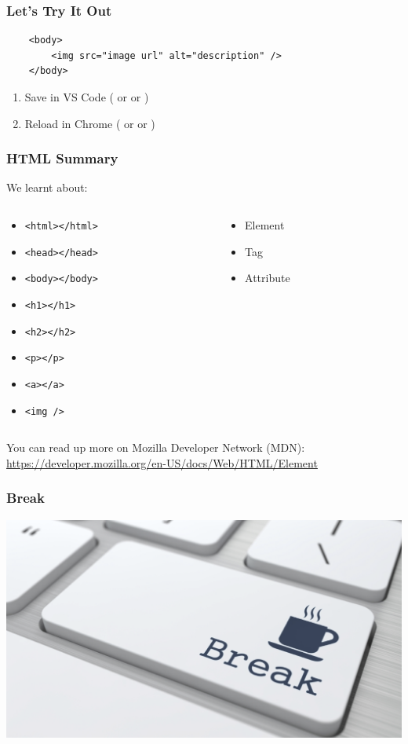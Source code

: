 \documentclass[12pt]{beamer}
\begin{document}
\begin{frame}[fragile]
\frametitle{Let's Try It Out}
\begin{verbatim}
	<body>
		<img src="image url" alt="description" />
	</body>
\end{verbatim}
\begin{enumerate}
	\item Save in VS Code ( or  or )
	\item Reload in Chrome ( or  or )
\end{enumerate}
\end{frame}

\begin{frame}
\frametitle{HTML Summary}
We learnt about:
\begin{columns}
	\begin{column}{0.5\textwidth}
		\begin{itemize}
			\item \texttt{<html></html>}
			\item \texttt{<head></head>}
			\item \texttt{<body></body>}
			\item \texttt{<h1></h1>}
			\item \texttt{<h2></h2>}
			\item \texttt{<p></p>}
			\item \texttt{<a></a>}
			\item \texttt{<img />}
		\end{itemize}
	\end{column}
	\begin{column}{0.5\textwidth}
		\begin{itemize}
			\item Element
			\item Tag
			\item Attribute
		\end{itemize}
	\end{column}
\end{columns}
You can read up more on Mozilla Developer Network (MDN): \url{https://developer.mozilla.org/en-US/docs/Web/HTML/Element}
\end{frame}

\begin{frame}
\frametitle{Break}
\includegraphics[width=\linewidth]{break}
\end{frame}
\end{document}
